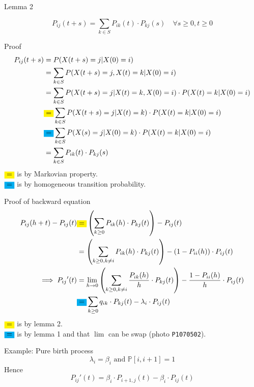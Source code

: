 \documentclass[mathserif]{beamer}
\begin{document}
\begin{frame}{Lemma 2}
\begin{lemma}
\[
P_{ij}(t+s) = \sum_{k\in S} P_{ik}(t)\cdot P_{kj}(s) \quad\forall s\geq 0, t\geq 0
\]
\end{lemma}
\end{frame}

\begin{frame}{Proof}
\begin{align*}
P_{ij}(t+s) & = P(X(t+s) = j | X(0) = i) \\
& = \sum_{k\in S} P(X(t+s) = j, X(t) = k | X(0) = i) \\
& = \sum_{k\in S} P(X(t+s) = j | X(t) = k, X(0) = i)\cdot P(X(t) = k | X(0) = i) \\
& \colorbox{yellow}{=} \sum_{k\in S} P(X(t+s) = j | X(t) = k)\cdot P(X(t) = k | X(0) = i) \\
& \colorbox{cyan}{=} \sum_{k\in S} P(X(s) = j | X(0) = k)\cdot P(X(t) = k | X(0) = i) \\
& = \sum_{k\in S} P_{ik}(t)\cdot P_{kj}(s)
\end{align*}
$\colorbox{yellow}{=}$ is by Markovian property.\\
$\colorbox{cyan}{=}$ is by homogeneous transition probability.
\end{frame}

\begin{frame}{Proof of backward equation}\label{backward_pf}
\begin{align*}
P_{ij}(h+t) - P_{ij}(t) & \colorbox{yellow}{=} \left( \sum_{k\geq 0} P_{ik}(h)\cdot P_{kj}(t) \right) - P_{ij}(t) \\
& = \left( \sum_{k\geq 0, k\neq i} P_{ik}(h)\cdot P_{kj}(t) \right) - (1 - P_{ii}(h))\cdot P_{ij}(t) \\
\implies {P_{ij}}'(t) & = \lim_{h\to 0}
\left( \sum_{k\geq 0, k\neq i} \frac{P_{ik}(h)}{h}\cdot P_{kj}(t) \right)
 - \frac{1 - P_{ii}(h)}{h}\cdot P_{ij}(t) \\
& \colorbox{cyan}{=} \sum_{k\geq 0} q_{ik}\cdot P_{kj}(t) - \lambda_i\cdot P_{ij}(t)
\end{align*}
$\colorbox{yellow}{=}$ is by lemma 2.\\
$\colorbox{cyan}{=}$ is by lemma 1 and that $\lim$ can be swap (photo \texttt{P1070502}).
\end{frame}

\begin{frame}{Example: Pure birth process}
\[
\lambda_i = \beta_i \text{ and } \mathbb{P}[i,i+1] = 1
\]
Hence
\[
{P_{ij}}'(t) = \beta_i\cdot P_{i+1,j}(t) - \beta_i\cdot P_{ij}(t)
\]
\end{frame}
\end{document}
